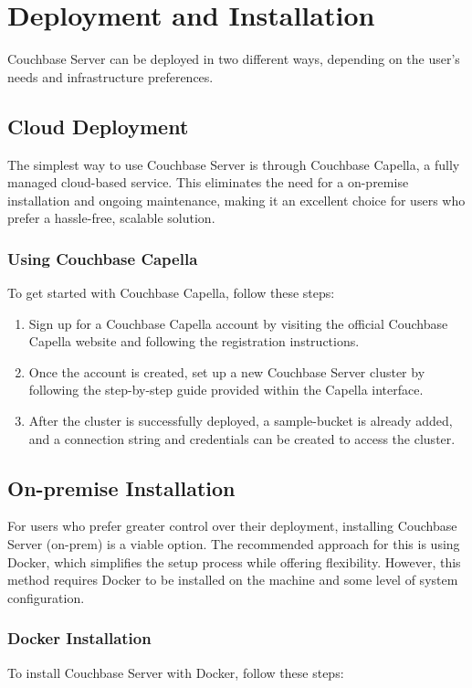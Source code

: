 \chapter{Deployment and Installation}

Couchbase Server can be deployed in two different ways, depending on the user's needs and infrastructure preferences.

\section{Cloud Deployment}
The simplest way to use Couchbase Server is through Couchbase Capella, a fully managed cloud-based service. This eliminates the need for a on-premise installation and ongoing maintenance, making it an excellent choice for users who prefer a hassle-free, scalable solution.

\subsection{Using Couchbase Capella}
To get started with Couchbase Capella, follow these steps:

\begin{enumerate}
  \item Sign up for a Couchbase Capella account by visiting the official Couchbase Capella website and following the registration instructions. \cite{couchbaseCapellaSignUp}
  \item Once the account is created, set up a new Couchbase Server cluster by following the step-by-step guide provided within the Capella interface.
  \item After the cluster is successfully deployed, a sample-bucket is already added, and a connection string and credentials can be created to access the cluster.
\end{enumerate}
\cite{couchbaseCapellaGettingStarted}

\section{On-premise Installation}
For users who prefer greater control over their deployment, installing Couchbase Server (on-prem) is a viable option. The recommended approach for this is using Docker, which simplifies the setup process while offering flexibility. However, this method requires Docker to be installed on the machine and some level of system configuration.

\subsection{Docker Installation}
To install Couchbase Server with Docker, follow these steps:

